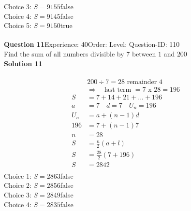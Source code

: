 \documentclass{article}
\begin{document}
Choice 3: \hspace{20pt}$S=9155$\hspace{20pt}false\\
Choice 4: \hspace{20pt}$S=9145$\hspace{20pt}false\\
Choice 5: \hspace{20pt}$S=9150$\hspace{20pt}true\\
\\[4pt]
\noindent\textbf{Question 11}\hspace{20pt}Experience: 40\hspace{20pt}Order: \hspace{20pt}Level: \hspace{20pt}Question-ID: 110\\[2pt]
Find the sum of all numbers divisible by 7 between $1$ and $200$\\[4pt]
\noindent\textbf{Solution 11}\\[2pt]
\\[-35pt]\begin{align*}
&200 \div 7 = 28 \,\, \text{remainder}\,\, 4\\[2pt]
&\Rightarrow \quad \text{last term }= 7 \,\,\text{x}\,\, 28=196\\[2pt]
S&=7+14+21+...+196\\[12pt]
a&=7\quad d=7 \quad U_n=196\\[2pt]
U_n&=a+(n-1)d\\[2pt]
196&=7+(n-1)7\\[2pt]
n&=28\\[12pt]
S&=\displaystyle\frac{n}{2}(a+l)\\[2pt]
S&=\displaystyle\frac{28}{2}(7+196)\\[2pt]
S&=2842\\[-140pt]
\end{align*}
Choice 1: \hspace{20pt}$S=2863$\hspace{20pt}false\\
Choice 2: \hspace{20pt}$S=2856$\hspace{20pt}false\\
Choice 3: \hspace{20pt}$S=2849$\hspace{20pt}false\\
Choice 4: \hspace{20pt}$S=2835$\hspace{20pt}false\\
\end{document}
